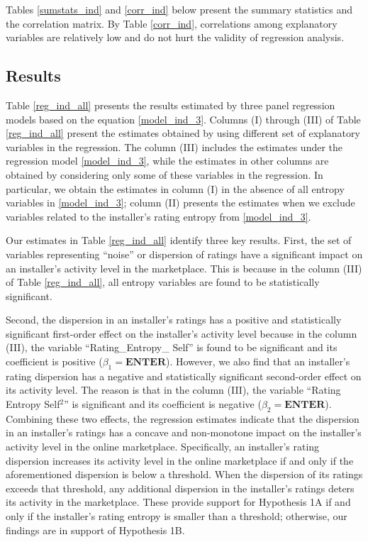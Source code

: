 \documentclass[msom,blindrev]{informs3}
\begin{document}
Tables \ref{sumstats_ind} and \ref{corr_ind} below present the summary statistics and the correlation matrix. By Table \ref{corr_ind}, correlations among explanatory variables are relatively low and do not hurt the validity of regression analysis.





\subsection{Results}

Table \ref{reg_ind_all} presents the results estimated by three panel regression models based on the equation \eqref{model_ind_3}. Columns (I) through (III) of Table \ref{reg_ind_all} present the estimates obtained by using different set of explanatory variables in the regression. The column (III) includes the estimates under the regression model \eqref{model_ind_3}, while the estimates in other columns are obtained by considering only some of these variables in the regression. In particular, we obtain the estimates in column (I) in the absence of all entropy variables in \eqref{model_ind_3}; column (II) presents the estimates when we exclude variables related to the installer's rating entropy from \eqref{model_ind_3}.




Our estimates in Table \ref{reg_ind_all} identify three key results. First, the set of variables representing ``noise'' or dispersion of ratings have a significant impact on an installer's activity level in the marketplace. This is because in the column (III) of Table \ref{reg_ind_all}, all entropy variables are found to be statistically significant.

Second, the dispersion in an installer's ratings has a positive and statistically significant first-order effect on the installer's activity level because in the column (III), the variable ``Rating\_Entropy\_ Self'' is found to be significant and its coefficient is positive ($\beta_{1} = \textbf{ENTER}$). However, we also find that an installer's rating dispersion has a negative and statistically significant second-order effect on its activity level. The reason is that in the column (III), the variable ``Rating Entropy Self$^2$'' is significant and its coefficient is negative ($\beta_{2} = \textbf{ENTER}$). Combining these two effects, the regression estimates indicate that the dispersion in an installer's ratings has a concave and non-monotone impact on the installer's activity level in the online marketplace. Specifically,  an installer's rating dispersion increases its activity level in the online marketplace if and only if the aforementioned dispersion is below a threshold. When the dispersion of its ratings exceeds that threshold, any additional dispersion in the installer's ratings deters its activity in the marketplace. These provide support for Hypothesis 1A if and only if the installer's rating entropy is smaller than a threshold; otherwise, our findings are in support of Hypothesis 1B.
\end{document}
